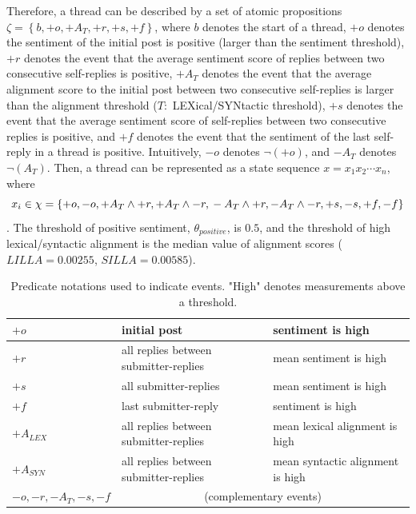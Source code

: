 Therefore, a thread can be described by a set of atomic propositions $\zeta=\left \{b, +o, +A_T, +r, +s, +f \right \}$, where $b$ denotes the start of a thread, $+o$ denotes the sentiment of the initial post is positive (larger than the sentiment threshold), $+r$ denotes the event that the average sentiment score of replies between two consecutive self-replies is positive, $+A_T$ denotes the event that the average alignment score to the initial post between two consecutive self-replies is larger than the alignment threshold ($T:$ LEXical/SYNtactic threshold), $+s$ denotes the event that the average sentiment score of self-replies between two consecutive replies is positive, and $+f$ denotes the event that the sentiment of the last self-reply in a thread is positive. Intuitively, $-o$ denotes $\neg(+o)$, and $-A_T$ denotes $\neg(A_T)$. Then, a thread can be represented as a state sequence $x=x_{1}x_{2} \cdots x_{n}$, where
\begin{dmath}
x_i \in \chi = \left \{+o, -o, +A_T\wedge+r, +A_T\wedge-r, \\ -A_T\wedge+r, -A_T\wedge-r, +s, -s, +f, -f \right \}
\end{dmath}.
The threshold of positive sentiment, $\theta_{positive}$, is $0.5$, and the threshold of high lexical/syntactic alignment is the median value of alignment scores ($LILLA = 0.00255$, $SILLA = 0.00585$).

\begin{table}[tb]
\centering
\begin{tabular}{l|l|l}

$+o$         & initial post & sentiment is high     \\ \hline
$+r$         & all replies between submitter-replies & mean sentiment is high     \\ \hline
$+s$         & all submitter-replies  & mean sentiment is high     \\ \hline
$+f$         & last submitter-reply & sentiment is high     \\ \hline
$+A_{LEX}$         & all replies between submitter-replies & mean lexical alignment is high \\ \hline
$+A_{SYN}$         & all replies between submitter-replies & mean syntactic alignment is high \\ \hline
$-o,-r,-A_T,-s,-f$         & \multicolumn{2}{c}{(complementary events)}  \\
\end{tabular}
\caption{Predicate notations used to indicate events.  "High" denotes measurements above a threshold.}
\label{tab:notations}
\end{table}



